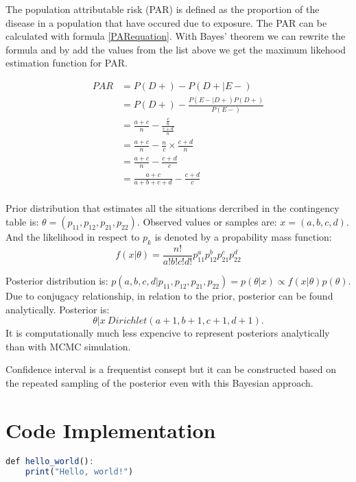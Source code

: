 The population attributable risk (PAR) is defined as the proportion of the disease in a population that have occured due to exposure. The PAR can be calculated with formula \ref{PARequation}. With Bayes' theorem we can rewrite the formula and by add the values from the list above we get the maximum likehood estimation function for PAR.

\begin{equation}
\begin{split}
PAR &= P(D+) - P(D+| E-) \\
    &= P(D+) - \frac{P(E-|D+)P(D+)}{P(E-)} \\
    &= \frac{a + c}{n} - \frac{\frac{c}{n}}{\frac{c + d}{n}} \\
    &= \frac{a + c}{n} - \frac{n}{c} \times  \frac{c + d}{n} \\
    &= \frac{a + c}{n} - \frac{c + d}{c} \\
    &= \frac{a + c}{a + b + c + d} - \frac{c + d}{c} \\
\end{split}
\end{equation}

Prior distribution that estimates all the situations dercribed in the contingency table is: 
$\theta = (p_{11}, p_{12}, p_{21}, p_{22})$. Observed values or samples are: $x = (a, b, c, d)$. And the likelihood in respect to $p_k$ is denoted by a propability mass function: 
\begin{equation}
    f(x|\theta) = \frac{n!}{a!b!c!d!}p_{11}^ap_{12}^bp_{21}^cp_{22}^d
\end{equation}

Posterior distribution is: $p(a,b,c,d|p_{11}, p_{12},p_{21},p_{22}) = p(\theta|x) \varpropto  f (x|\theta)p(\theta)$. Due to conjugacy relationship, in relation to the prior, posterior can be found analytically. Posterior is:
\begin{equation}
    \theta|x ~ Dirichlet(a + 1, b + 1, c + 1, d + 1).
\end{equation}
It is computationally much less expencive to represent posteriors analytically than with MCMC simulation. 

Confidence interval is a frequentist consept but it can be constructed based on the repeated sampling of the posterior even with this Bayesian approach. \cite{Pirikahu2016BayesianMO}

\section{Code Implementation} \label{CodeImplementation}
\begin{lstlisting}[language=R]
def hello_world():
    print("Hello, world!")
\end{lstlisting}